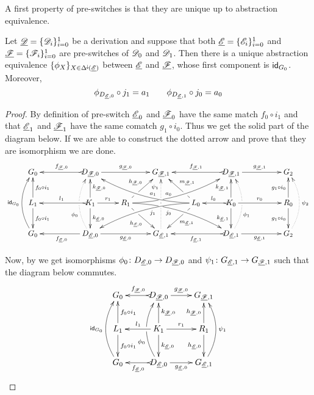 A first property of pre-switches is that they are unique up to abstraction equivalence.

\begin{lemma}
	\label{thm:switch_uni}
	Let $\underline{\mathscr{D}}=\{\mathscr{D}_{i}\}_{i=0}^1$ be a derivation and suppose
	that both $\underline{\mathscr{E}}=\{\mathscr{E}_i\}_{i=0}^1$ and
	$\underline{\mathscr{F}}=\{\mathscr{F}_i\}_{i=0}^1$ are pre-switches of $\mathscr{D}_0$ and
	$\mathscr{D}_1$. Then there is a unique abstraction equivalence $\{\phi_X\}_{X\in \Delta^{\hspace{-1pt}\downarrow\hspace{-1pt}}(\underline{\mathscr{E}})}$ between $\underline{\mathscr{E}}$ and $\underline{\mathscr{F}}$, whose first component is $\mathsf{id}_{G_0}$. Moreover, 
	\[\phi_{D_{\underline{\mathscr{E}}, 0}}\circ j_1=a_1 \qquad \phi_{D_{\underline{\mathscr{E}}, 1}}\circ j_0=a_0\]
\end{lemma}

\begin{proof}
	By definition of pre-switch $\underline{\mathscr{E}}_0$ and $\underline{\mathscr{F}}_0$ have the same match $f_0\circ i_1$ and that $\underline{\mathscr{E}}_1$ and $\underline{\mathscr{F}}_1$ have the same comatch $g_1\circ i_0$. Thus we get the solid part of the diagram below. If we are able to construct the dotted arrow and prove that they are isomorphism we are done.
	\[\xymatrix@C=22pt{G_{0} && \ar@{>->}[ll]_{f_{\der{F},0}} D_{\der{F},0} \ar[rr]^{g_{\der{F},0}}&& G_{\der{F},1} && \ar@{>->}[ll]_{f_{\der{F},1}} D_{\der{F},1} \ar[rr]^{g_{\der{F},1}}&& G_{2}\\L_1 \ar[d]^{f_0\circ i_1} \ar[u]_{f_0\circ i_1}&& K_{1} \ar[d]^{k_{\der{E},0}} \ar[u]_{k_{\der{F},0}}\ar@{>->}[ll]_{l_1} \ar[r]^{r_1} & R_{1} \ar@/^.35cm/[drrr]|(.315)\hole_(.4){j_0} \ar[dr]|(.3)\hole_{h_{\der{E},0}} \ar@/_.35cm/[urrr]|(.315)\hole^(.4){a_0} \ar[ur]|(.3)\hole^{h_{\der{F},0}}& &L_{0} \ar@/_.35cm/[dlll]^(.4){j_1} \ar[dl]|(.3)\hole^{m_{\der{E},1}} \ar@/^.35cm/[ulll]_(.4){a_1} \ar[ul]|(.3)\hole_{m_{\der{F},1}}& K_{0} \ar[d]_{k_{\der{E},1}} \ar[u]^{k_{\der{F},1}}\ar@{>->}[l]_{l_{0}} \ar[rr]^{r_0} && R_{0} \ar[d]_{g_1\circ i_0} \ar[u]^{g_1\circ i_0}\\ \ar@/^.5cm/[uu]^{\id{G_0}} G_{0} && \ar[ll]^{f_{\der{E},0}} D_{\der{E},0} \ar@{.>}@/^.5cm/[uu]^(.33){\phi_{0}}|\hole \ar[rr]_{g_{\der{E},0}}&& G_{\der{E},1} \ar@{.>}[uu]^(.76){\psi_1}|(.45)\hole |(.55)\hole&& \ar@{>->}[ll]^{f_{\der{E},1}} D_{\der{E},1} \ar@{.>}@/_.5cm/[uu]_(.33){\phi_{1}}|\hole\ar[rr]_{g_{\der{E},1}}&& G_{2}\ar@{.>}@/_.5cm/[uu]_{\psi_2}}\]
	
	Now, by  we get isomorphisms $\phi_0\colon D_{\underline{\mathscr{E}},0}\to D_{\underline{\mathscr{F}},0}$ and $\psi_1 \colon G_{\underline{\mathscr{E}},1}\to G_{\underline{\mathscr{F}},1}$ such that the diagram below commutes.
	\[\xymatrix{G_{0} & \ar@{>->}[l]_{f_{\der{F},0}} D_{\der{F},0} \ar[r]^{g_{\der{F},0}}& G_{\der{F},1} \\L_1 \ar[d]^{f_0\circ i_1} \ar[u]_{f_0\circ i_1}& K_{1} \ar[d]^{k_{\der{E},0}} \ar[u]_{k_{\der{F},0}}\ar[l]_{l_1} \ar[r]^{r_1} & R_{1}  \ar[d]_{h_{\der{E},0}}  \ar[u]^{h_{\der{F},0}}\\ \ar@/^.5cm/[uu]^{\id{G_0}} G_{0} & \ar@{>->}[l]^{f_{\der{E},0}} D_{\der{E},0} \ar@/^.5cm/[uu]^(.33){\phi_{0}}|\hole \ar[r]_{g_{\der{E},0}}& G_{\der{E},1} \ar@/_.5cm/[uu]_{\psi_1}}\]
	

\end{proof}
